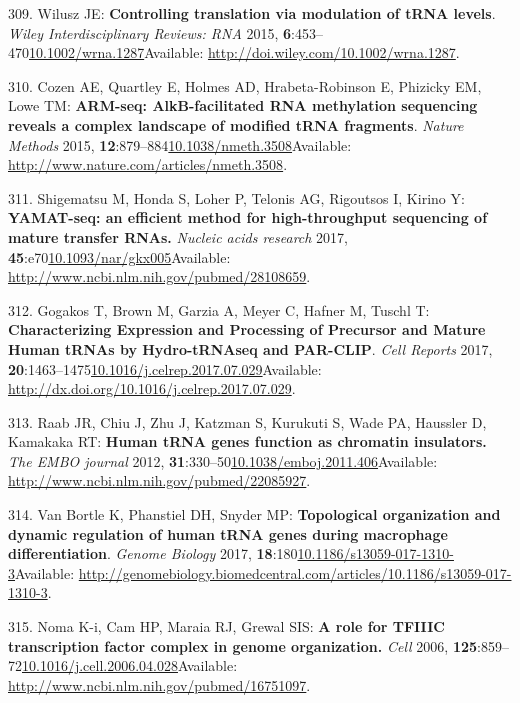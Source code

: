 \documentclass[
]{book}
\begin{document}
\leavevmode\hypertarget{ref-Wilusz2015}{}%
309. Wilusz JE: \textbf{Controlling translation via modulation of tRNA levels}. \emph{Wiley Interdisciplinary Reviews: RNA} 2015, \textbf{6}:453--470\href{https://doi.org/10.1002/wrna.1287}{10.1002/wrna.1287}Available: \url{http://doi.wiley.com/10.1002/wrna.1287}.

\leavevmode\hypertarget{ref-Cozen2015}{}%
310. Cozen AE, Quartley E, Holmes AD, Hrabeta-Robinson E, Phizicky EM, Lowe TM: \textbf{ARM-seq: AlkB-facilitated RNA methylation sequencing reveals a complex landscape of modified tRNA fragments}. \emph{Nature Methods} 2015, \textbf{12}:879--884\href{https://doi.org/10.1038/nmeth.3508}{10.1038/nmeth.3508}Available: \url{http://www.nature.com/articles/nmeth.3508}.

\leavevmode\hypertarget{ref-Shigematsu2017a}{}%
311. Shigematsu M, Honda S, Loher P, Telonis AG, Rigoutsos I, Kirino Y: \textbf{YAMAT-seq: an efficient method for high-throughput sequencing of mature transfer RNAs.} \emph{Nucleic acids research} 2017, \textbf{45}:e70\href{https://doi.org/10.1093/nar/gkx005}{10.1093/nar/gkx005}Available: \url{http://www.ncbi.nlm.nih.gov/pubmed/28108659}.

\leavevmode\hypertarget{ref-Gogakos2017}{}%
312. Gogakos T, Brown M, Garzia A, Meyer C, Hafner M, Tuschl T: \textbf{Characterizing Expression and Processing of Precursor and Mature Human tRNAs by Hydro-tRNAseq and PAR-CLIP}. \emph{Cell Reports} 2017, \textbf{20}:1463--1475\href{https://doi.org/10.1016/j.celrep.2017.07.029}{10.1016/j.celrep.2017.07.029}Available: \url{http://dx.doi.org/10.1016/j.celrep.2017.07.029}.

\leavevmode\hypertarget{ref-Raab2011}{}%
313. Raab JR, Chiu J, Zhu J, Katzman S, Kurukuti S, Wade PA, Haussler D, Kamakaka RT: \textbf{Human tRNA genes function as chromatin insulators.} \emph{The EMBO journal} 2012, \textbf{31}:330--50\href{https://doi.org/10.1038/emboj.2011.406}{10.1038/emboj.2011.406}Available: \url{http://www.ncbi.nlm.nih.gov/pubmed/22085927}.

\leavevmode\hypertarget{ref-VanBortle2017}{}%
314. Van Bortle K, Phanstiel DH, Snyder MP: \textbf{Topological organization and dynamic regulation of human tRNA genes during macrophage differentiation}. \emph{Genome Biology} 2017, \textbf{18}:180\href{https://doi.org/10.1186/s13059-017-1310-3}{10.1186/s13059-017-1310-3}Available: \url{http://genomebiology.biomedcentral.com/articles/10.1186/s13059-017-1310-3}.

\leavevmode\hypertarget{ref-Noma2006}{}%
315. Noma K-i, Cam HP, Maraia RJ, Grewal SIS: \textbf{A role for TFIIIC transcription factor complex in genome organization.} \emph{Cell} 2006, \textbf{125}:859--72\href{https://doi.org/10.1016/j.cell.2006.04.028}{10.1016/j.cell.2006.04.028}Available: \url{http://www.ncbi.nlm.nih.gov/pubmed/16751097}.
\end{document}
